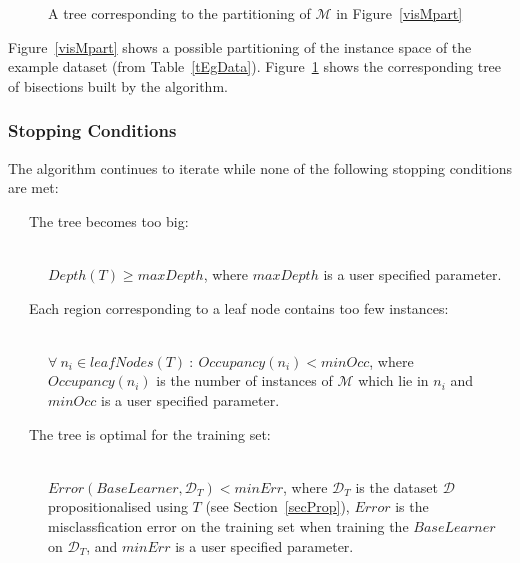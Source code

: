 \documentclass[a4paper,12pt]{article} %
\newcommand{\mcl}[1]{\mathcal{#1}}
\begin{document}
\begin{figure}
\begin{center}
\end{center}
\caption{A tree corresponding to the partitioning of $\mcl{M}$ in Figure~\ref{visMpart}}
\label{visMTree}
\end{figure}
    
Figure~\ref{visMpart} shows a possible partitioning of 
    the instance space of the example dataset (from Table~\ref{tEgData}).
Figure~\ref{visMTree} shows the corresponding tree of bisections built by
    the algorithm.

\subsubsection{Stopping Conditions}
\label{secStopCond}

The algorithm continues to iterate while none of the following stopping conditions are met:
\begin{description}

\item[~~~The tree becomes too big:] \ \\
    $Depth(T) \geq maxDepth$, 
    where  $maxDepth$ is a user specified parameter.
\item[~~~Each region corresponding to a leaf node contains too few instances:] \ \\ 
    $\forall~n_i \in leafNodes(T) ~:~ Occupancy(n_i) < minOcc$, 
    where $Occupancy(n_i)$ is the number of instances of $\mcl{M}$ which lie in $n_i$ and
    $minOcc$ is a user specified parameter.
\item[~~~The tree is optimal for the training set:] \ \\
    $Error(BaseLearner, \mcl{D}_T) < minErr$, 
    where $\mcl{D}_T$ is the dataset $\mcl{D}$ propositionalised using $T$ (see Section~\ref{secProp}),
    $Error$ is the misclassfication error on the training set when 
    training the $BaseLearner$ on $\mcl{D}_T$,
    and $minErr$ is a user specified parameter.

\end{description}
\end{document}
